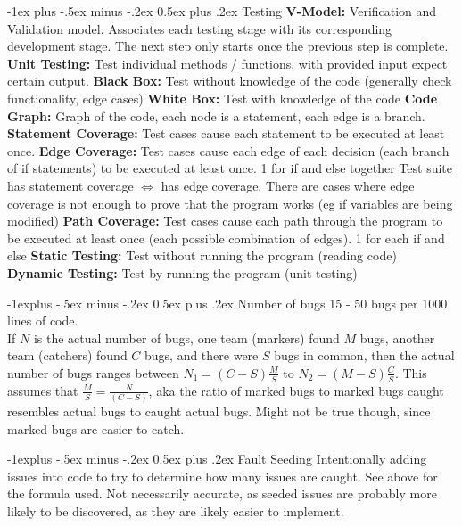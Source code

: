 \documentclass[letterpaper, 8pt]{extarticle}
\makeatletter
\renewcommand{\section}{\@startsection{section}{1}{0mm}%
                                {-1ex plus -.5ex minus -.2ex}%
                                {0.5ex plus .2ex}%
                                {\normalfont\normalsize\bfseries}}
\renewcommand{\subsection}{\@startsection{subsection}{2}{0mm}%
                                {-1explus -.5ex minus -.2ex}%
                                {0.5ex plus .2ex}%
                                {\normalfont\small\bfseries}}
\makeatother
\begin{document}
\begin{multicols*}{5}
  \section{Testing}
  \textbf{V-Model:} Verification and Validation model. Associates each testing stage with its corresponding development stage. The next
  step only starts once the previous step is complete.
  \textbf{Unit Testing:} Test individual methods / functions, with provided input expect certain output.
  \textbf{Black Box:} Test without knowledge of the code (generally check functionality, edge cases)
  \textbf{White Box:} Test with knowledge of the code
  \textbf{Code Graph:} Graph of the code, each node is a statement, each edge is a branch.
  \textbf{Statement Coverage:} Test cases cause each statement to be executed at least once.
  \textbf{Edge Coverage:} Test cases cause each edge of each decision (each branch of if statements) to be executed at least once. 1 for if and else together
  Test suite has statement coverage $\Leftrightarrow$ has edge coverage.
  There are cases where edge coverage is not enough to prove that the program works
  (eg if variables are being modified)
  \textbf{Path Coverage:} Test cases cause each path through the program to be executed at least once (each possible combination of edges). 1 for each if and else
  \textbf{Static Testing:} Test without running the program (reading code)
  \textbf{Dynamic Testing:} Test by running the program (unit testing)

  \subsection{Number of bugs}
  15 - 50 bugs per 1000 lines of code. \\
  If $N$ is the actual number of bugs, one team (markers) found $M$ bugs, another team (catchers) found $C$ bugs, and there were $S$ bugs in common,
  then the actual number of bugs ranges between $N_1 = (C - S) \frac{M}{S}$ to $N_2 = (M - S) \frac{C}{S}$.
  This assumes that $\frac{M}{S} = \frac{N}{(C-S)}$, aka the ratio of marked bugs to marked bugs caught resembles actual bugs to caught actual bugs. Might not be true though, since marked bugs are easier to catch.

  \subsection{Fault Seeding}
  Intentionally adding issues into code to try to determine how many issues are caught. See above for the formula used.
  Not necessarily accurate, as seeded issues are probably more likely to be discovered, as they are likely easier to implement. 

\end{multicols*}
\end{document}
